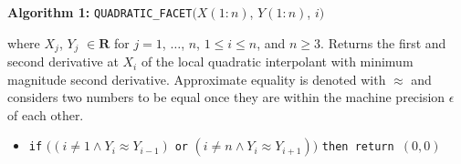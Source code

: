 \vskip 5mm
{\parindent 0mm
{\bf Algorithm 1:}
{\tt QUADRATIC\_FACET}$\bigl(X(1{:}n)$, $Y(1{:}n)$, $i \bigr)$

\nobreak
where $X_j$, $Y_j$ $\in \mathbf{R}$ for $j = 1$, $\ldots$, $n$, $1 \le i
\le n$, and $n \ge 3$. Returns the first and second derivative at 
$X_i$ of the local quadratic interpolant with minimum magnitude
second derivative. Approximate equality is denoted with
$\approx$ and considers two numbers to be equal once they are within
the machine precision $\epsilon$ of each other.

}
{\parindent=3mm
\begin{itemize}
\item[]{ {\tt if} $\bigl((i\ne1\wedge Y_i \approx Y_{i-1})$ {\tt or}
$(i\ne n\wedge Y_i \approx Y_{i+1})\bigr)$ {\tt then return $(0,0)$}}


\end{itemize}}
